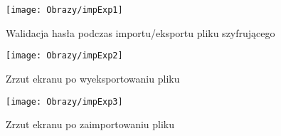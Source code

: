 \begin{enumerate*}
	\begin{figure}[ht!]
		\begin{minipage}{0.2\textwidth}
			\texttt{[image: Obrazy/impExp1]}
			\caption{Walidacja hasła podczas importu/eksportu pliku szyfrującego }
			\label{rys:impExp1}
		\end{minipage}
		\begin{minipage}{0.2\textwidth}
			\texttt{[image: Obrazy/impExp2]}
			\caption{Zrzut ekranu po wyeksportowaniu pliku }
			\label{rys:impExp2}
		\end{minipage}
		
		\begin{minipage}{0.2\textwidth}
			\texttt{[image: Obrazy/impExp3]}
			\caption{Zrzut ekranu po zaimportowaniu pliku }
			\label{rys:impExp3}
		\end{minipage}
	\end{figure}
	
\end{enumerate*}
